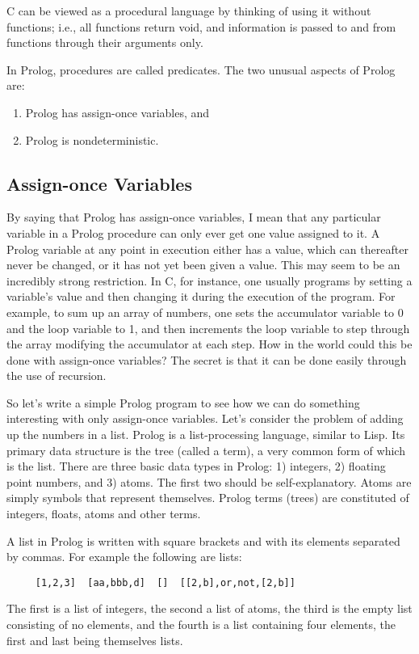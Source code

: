C can be viewed as a procedural language by thinking of using it
without functions; i.e., all functions return void, and information is
passed to and from functions through their arguments only.

In Prolog, procedures are called predicates.  The two unusual aspects
of Prolog are:
\begin{enumerate}
\item Prolog has assign-once variables, and 
\item Prolog is nondeterministic.
\end{enumerate}

\subsection{Assign-once Variables}

By saying that Prolog has assign-once variables, I mean that any
particular variable in a Prolog procedure can only ever get one value
assigned to it.  A Prolog variable at any point in execution either
has a value, which can thereafter never be changed, or it has not yet
been given a value.  This may seem to be an incredibly strong
restriction.  In C, for instance, one usually programs by setting
a variable's value and then changing it during the execution of the
program.  For example, to sum up an array of numbers, one sets the
accumulator variable to 0 and the loop variable to 1, and then
increments the loop variable to step through the array modifying the
accumulator at each step.  How in the world could this be done with
assign-once variables?  The secret is that it can be done easily
through the use of recursion.

So let's write a simple Prolog program to see how we can do something
interesting with only assign-once variables.  Let's consider the
problem of adding up the numbers in a list.  Prolog is a
list-processing language, similar to Lisp.  Its primary data structure
is the tree (called a term), a very common form of which is the list.
There are three basic data types in Prolog: 1) integers, 2) floating
point numbers, and 3) atoms.  The first two should be
self-explanatory.  Atoms are simply symbols that represent themselves.
Prolog terms (trees) are constituted of integers, floats, atoms and
other terms.

A list in Prolog is written with square brackets and with its elements
separated by commas.  For example the following are lists:
\begin{verbatim}
     [1,2,3]  [aa,bbb,d]  []  [[2,b],or,not,[2,b]]
\end{verbatim}
The first is a list of integers, the second a list of atoms, the third
is the empty list consisting of no elements, and the fourth is a list
containing four elements, the first and last being themselves lists.

